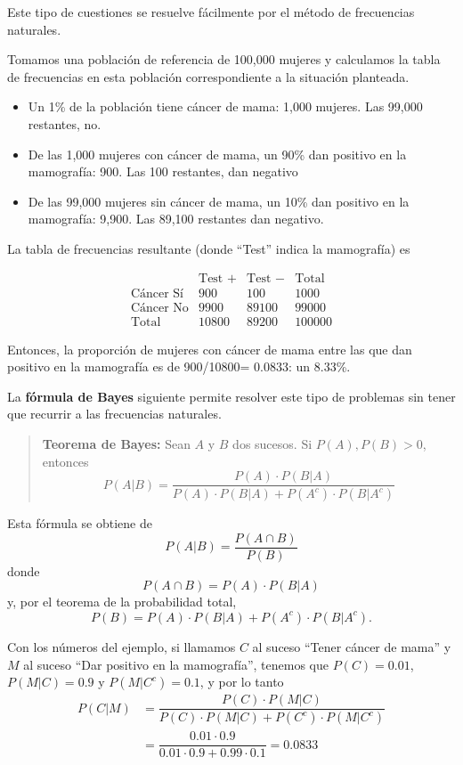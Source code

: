 \documentclass[
  spanish,
  letterpaper,
  DIV=11,
  numbers=noendperiod]{scrreprt}
\begin{document}
\begin{tcolorbox}
Este tipo de cuestiones se resuelve fácilmente por el método de
frecuencias naturales.

Tomamos una población de referencia de 100,000 mujeres y calculamos la
tabla de frecuencias en esta población correspondiente a la situación
planteada.

\begin{itemize}
\item
  Un 1\% de la población tiene cáncer de mama: 1,000 mujeres. Las 99,000
  restantes, no.
\item
  De las 1,000 mujeres con cáncer de mama, un 90\% dan positivo en la
  mamografía: 900. Las 100 restantes, dan negativo
\item
  De las 99,000 mujeres sin cáncer de mama, un 10\% dan positivo en la
  mamografía: 9,900. Las 89,100 restantes dan negativo.
\end{itemize}

La tabla de frecuencias resultante (donde ``Test'' indica la mamografía)
es

\[
\begin{array}{l|c|c|c}
& \text{Test }+ & \text{Test }- & \text{Total}\\
\hline
\text{Cáncer Sí} & 900 & 100 & 1000\\ \hline
\text{Cáncer No} & 9900& 89100 & 99000\\\hline
\text{Total} &10800 & 89200&  100000
\end{array}
\]

Entonces, la proporción de mujeres con cáncer de mama entre las que dan
positivo en la mamografía es de 900/10800= 0.0833: un 8.33\%.

La \textbf{fórmula de Bayes} siguiente permite resolver este tipo de
problemas sin tener que recurrir a las frecuencias naturales.

\begin{quote}
\textbf{Teorema de Bayes:} Sean \(A\) y \(B\) dos sucesos. Si
\(P(A),P(B)>0\), entonces \[
P(A|B) =\dfrac{P(A)\cdot P(B|A)}{P(A)\cdot P(B|A)+P(A^c)\cdot P(B|A^c)}
\]
\end{quote}

Esta fórmula se obtiene de \[
P(A|B) =\dfrac{P(A \cap B)}{P(B)}
\] donde \[
P(A \cap B)=P(A)\cdot P(B|A)
\] y, por el teorema de la probabilidad total, \[
P(B)=P(A)\cdot P(B|A)+P(A^c)\cdot P(B|A^c).
\]

Con los números del ejemplo, si llamamos \(C\) al suceso ``Tener cáncer
de mama'' y \(M\) al suceso ``Dar positivo en la mamografía'', tenemos
que \(P(C)=0.01\), \(P(M|C)=0.9\) y \(P(M|C^c)=0.1\), y por lo tanto \[
\begin{array}{rl}
P(C|M)\!\!\!\! & =\dfrac{P(C)\cdot P(M|C)}{P(C)\cdot P(M|C)+P(C^c)\cdot P(M|C^c)}\\
& =\dfrac{0.01\cdot 0.9}{0.01\cdot 0.9+0.99\cdot 0.1}=0.0833
\end{array}
\]


\end{tcolorbox}
\end{document}
